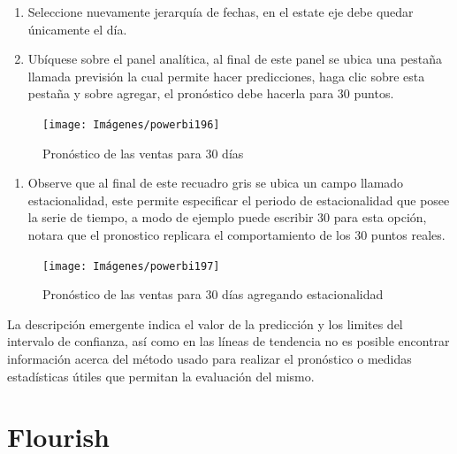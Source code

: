 \documentclass[
]{book}
\providecommand{\tightlist}{%
  \setlength{\itemsep}{0pt}\setlength{\parskip}{0pt}}
\begin{document}
\begin{enumerate}
\def\labelenumi{\arabic{enumi}.}
\setcounter{enumi}{4}
\item
  Seleccione nuevamente jerarquía de fechas, en el estate eje debe quedar únicamente el día.
\item
  Ubíquese sobre el panel analítica, al final de este panel se ubica una pestaña llamada previsión la cual permite hacer predicciones, haga clic sobre esta pestaña y sobre agregar, el pronóstico debe hacerla para 30 puntos.
\end{enumerate}

\begin{figure}

{\centering \texttt{[image: Imágenes/powerbi196]} 

}

\caption{Pronóstico de las ventas para 30 días}\label{fig:paso6pronosticopowerbi-fig}
\end{figure}

\begin{enumerate}
\def\labelenumi{\arabic{enumi}.}
\setcounter{enumi}{6}
\tightlist
\item
  Observe que al final de este recuadro gris se ubica un campo llamado estacionalidad, este permite especificar el periodo de estacionalidad que posee la serie de tiempo, a modo de ejemplo puede escribir 30 para esta opción, notara que el pronostico replicara el comportamiento de los 30 puntos reales.
\end{enumerate}

\begin{figure}

{\centering \texttt{[image: Imágenes/powerbi197]} 

}

\caption{Pronóstico de las ventas para 30 días agregando estacionalidad}\label{fig:paso7pronosticopowerbi-fig}
\end{figure}

La descripción emergente indica el valor de la predicción y los limites del intervalo de confianza, así como en las líneas de tendencia no es posible encontrar información acerca del método usado para realizar el pronóstico o medidas estadísticas útiles que permitan la evaluación del mismo.

\hypertarget{flourish}{%
\chapter{Flourish}\label{flourish}}
\end{document}
